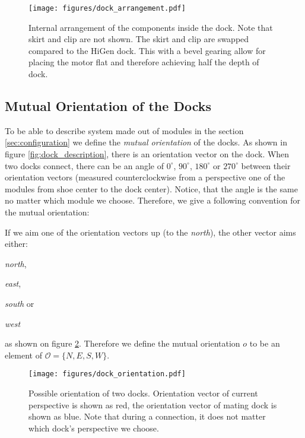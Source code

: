 \begin{figure}[!ht]
    \centering
    \texttt{[image: figures/dock\_arrangement.pdf]}
    \caption{Internal arrangement of the components inside the dock. Note that
    skirt and clip are not shown. The skirt and clip are swapped compared to the
    HiGen dock. This with a bevel gearing allow for placing the motor flat and
    therefore achieving half the depth of dock.}
    \label{fig:dock_internal_arrangement}
\end{figure}

\subsection{Mutual Orientation of the Docks}\label{sec:mutual_orientation}

To be able to describe system made out of modules in the section
\ref{sec:configuration} we define the \emph{mutual orientation} of the docks. As
shown in figure \ref{fig:dock_description}, there is an orientation vector on
the dock. When two docks connect, there can be an angle of $0^\circ$,
$90^\circ$, $180^\circ$ or $270^\circ$ between their orientation vectors
(measured counterclockwise from a perspective one of the modules from shoe
center to the dock center). Notice, that the angle is the same no matter which
module we choose. Therefore, we give a following convention for the mutual
orientation:

If we aim one of the orientation vectors up (to the \emph{north}), the other
vector aims either:
\begin{enumerate*}
    \item \emph{north},
    \item \emph{east},
    \item \emph{south} or
    \item \emph{west}
\end{enumerate*}
as shown on figure \ref{fig:dock_orientation}. Therefore we define the mutual
orientation $o$ to be an element of $\mathcal{O} = \{N, E, S, W\}$.

\begin{figure}[!ht]
    \centering
    \texttt{[image: figures/dock\_orientation.pdf]}
    \caption{Possible orientation of two docks. Orientation vector of current
    perspective is shown as red, the orientation vector of mating dock is shown
    as blue. Note that during a connection, it does not matter which dock's
    perspective we choose.}
    \label{fig:dock_orientation}
\end{figure}


